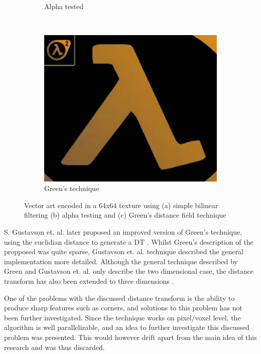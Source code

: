 \begin{figure}[!h]
\begin{subfigure}[b]{0.3\textwidth}
        \caption{Alpha tested}
        \label{fig:valveA}
    \end{subfigure}
    ~ 
    \begin{subfigure}[b]{0.3\textwidth}
        \includegraphics[width=\textwidth]{Theory/Figs/ValveGreensTechnique.png}
        \caption{Green's technique}
        \label{fig:valveC}
    \end{subfigure}
    \caption{Vector art encoded in a 64x64 texture using (a) simple bilinear filtering (b) alpha testing and (c) Green's distance field technique}
    \label{fig:GreensDT}
\end{figure}

S. Gustavson et. al. later proposed an improved version of Green's technique, using the euclidian distance to generate a DT \cite{gustavson2011anti}. Whilst Green's description of the propposed was quite sparse, Gustavson et. al. technique described the general implementation more detailed. Although the general technique described by Green and Gustavson et. al. only describe the two dimensional case, the distance transform has also been extended to three dimensions \cite{jones20063d}. 

One of the problems with the discussed distance transform is the ability to produce sharp features such as corners, and solutions to this problem has not been further investigated. Since the technique works on pixel/voxel level, the algorithm is well parallelizable, and an idea to further investigate this discussed problem was presented. This would however drift apart from the main idea of this research and was thus discarded.

